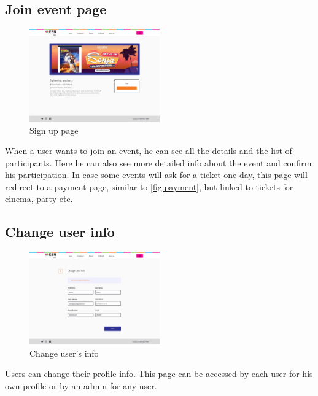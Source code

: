 \subsection{Join event page}
\begin{figure}[H]
    \centering
    \includegraphics[width=0.5\textwidth]{images/JoinEvent.png}
    \caption{Sign up page}
    \label{fig:joinEvent}
\end{figure}
When a user wants to join an event, he can see all the details and the list of participants. Here
he can also see more detailed info about the event and confirm his participation. In case some events
will ask for a ticket one day, this page will redirect to a payment page, similar to \ref{fig:payment},
but linked to tickets for cinema, party etc.
\subsection{Change user info}
\begin{figure}[H]
    \centering
    \includegraphics[width=0.5\textwidth]{images/ChangeUserDetail.png}
    \caption{Change user's info}
    \label{fig:change info}
\end{figure}
Users can change their profile info. This page can be accessed by each user for his own profile or 
by an admin for any user.